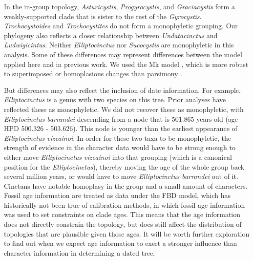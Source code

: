 \documentclass{article}
\begin{document}
In the in-group topology, \textit{Asturicystis}, \textit{Progyrocystis}, and \textit{Graciacystis} form a weakly-supported clade that is sister to the rest of the \textit{Gyrocystis}.
\textit{Trochocystoides} and \textit{Trochocystites} do not form a monophyletic grouping. 
Our phylogeny also reflects a closer relationship between \textit{Undatacinctus} and \textit{Ludwigicintus}. 
Neither \textit{Elliptocinctus} nor \textit{Sucocystis} are monophyletic in this analysis.
Some of these differences may represent differences between the model applied here and in previous work.
We used the Mk model \citep{Lewis2001}, which is more robust to superimposed or homoplasious changes than parsimony \citep{Felsenstein1978, Wright2014}.

But differences may also reflect the inclusion of date information.
For example, \textit{Elliptocinctus} is a genus with two species on this tree. 
Prior analyses have reflected these as monophyletic.
We did not recover these as monophyletic, with \textit{Elliptocinctus barrandei} descending from a node that is 501.865 years old (age HPD 500.326 - 503.626).
This node is younger than the earliest appearance of \textit{Elliptocinctus vizcainoi}.
In order for these two taxa to be monophyletic, the strength of evidence in the character data would have to be strong enough to either move \textit{Elliptocinctus vizcainoi} into that grouping (which is a canonical position for the \textit{Elliptocinctus}), thereby moving the age of the whole group back several million years, or would have to move \textit{Elliptocinctus barrandei} out of it.
Cinctans have notable homoplasy in the group and a small amount of characters.
Fossil age information are treated as data under the FBD model, which has historically not been true of calibration methods, in which fossil age information was used to set constraints on clade ages.
This means that the age information does not directly constrain the topology, but does still affect the distribution of topologies that are plausible given those ages. 
It will be worth further exploration to find out when we expect age information to exert a stronger influence than character information in determining a dated tree.
\end{document}
